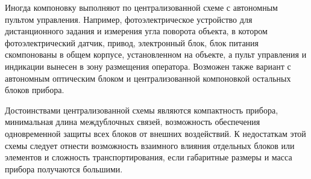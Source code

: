 Иногда компоновку выполняют по централизованной схеме с автономным пультом управления. Например, фотоэлектрическое устройство для дистанционного задания и измерения угла поворота объекта, в котором фотоэлектрический датчик, привод, электронный блок, блок питания скомпонованы в общем корпусе, установленном на объекте, а пульт управления и индикации вынесен в зону размещения оператора. Возможен также вариант с автономным оптическим блоком и централизованной компоновкой остальных блоков прибора.

Достоинствами централизованной схемы являются компактность прибора, минимальная длина междублочных связей, возможность обеспечения одновременной защиты всех блоков от внешних воздействий. 
К недостаткам этой схемы следует отнести возможность взаимного влияния отдельных блоков или элементов и сложность транспортирования, если габаритные размеры и масса прибора получаются большими.

